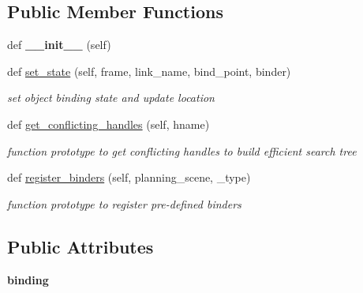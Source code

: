 \subsection*{Public Member Functions}
\begin{DoxyCompactItemize}
\item 
\mbox{\label{classrnb-planning_1_1src_1_1pkg_1_1planning_1_1constraint_1_1constraint__object_1_1_object_action_a92039f788d30b97c8e024fb23f6cf6d8}} 
def {\bfseries \+\_\+\+\_\+init\+\_\+\+\_\+} (self)
\item 
def \hyperlink{classrnb-planning_1_1src_1_1pkg_1_1planning_1_1constraint_1_1constraint__object_1_1_object_action_abb976bc1f2d94e8489144359c53f5e48}{set\+\_\+state} (self, frame, link\+\_\+name, bind\+\_\+point, binder)
\begin{DoxyCompactList}\small\item\em set object binding state and update location \end{DoxyCompactList}\item 
def \hyperlink{classrnb-planning_1_1src_1_1pkg_1_1planning_1_1constraint_1_1constraint__object_1_1_object_action_a04a8f195615a238251d13122ab343ee5}{get\+\_\+conflicting\+\_\+handles} (self, hname)
\begin{DoxyCompactList}\small\item\em function prototype to get conflicting handles to build efficient search tree \end{DoxyCompactList}\item 
def \hyperlink{classrnb-planning_1_1src_1_1pkg_1_1planning_1_1constraint_1_1constraint__object_1_1_object_action_aec4d674f87e5a504c2797e22c375f8b9}{register\+\_\+binders} (self, planning\+\_\+scene, \+\_\+type)
\begin{DoxyCompactList}\small\item\em function prototype to register pre-\/defined binders \end{DoxyCompactList}\end{DoxyCompactItemize}
\subsection*{Public Attributes}
\begin{DoxyCompactItemize}
\item 
\mbox{\label{classrnb-planning_1_1src_1_1pkg_1_1planning_1_1constraint_1_1constraint__object_1_1_object_action_ae5ee8c9823c82559f42cf712f4828f26}} 
{\bfseries binding}
\end{DoxyCompactItemize}


